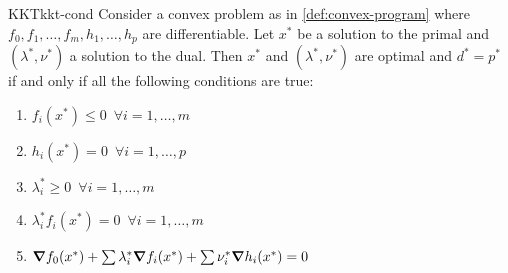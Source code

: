 \documentclass[12pt]{extarticle}
\begin{document}
\begin{theorem}{KKT}{kkt-cond}
	Consider a convex problem as in \cref{def:convex-program} where $f_0, f_1, \dots, f_m, h_1, \dots, h_p$
	are differentiable.
	Let $x^*$ be a solution to the primal and $(\lambda^*, \nu^*)$ a solution to the dual.
	Then $x^*$ and $(\lambda^*, \nu^*)$ are optimal and $d^* = p^*$ if and only if all the following
	conditions are true:
	\begin{enumerate}[label=(\roman*.)]
		\item $f_i(x^*) \leq 0 \enspace \forall i = 1, \dots, m$
		\item $h_i(x^*) = 0 \enspace \forall i = 1, \dots, p$
		\item $\lambda_i^* \geq 0 \enspace \forall i = 1, \dots, m$
		\item $\lambda^*_i f_i(x^*) = 0 \enspace \forall i = 1, \dots, m$
		\item $\grad f_0(x^*) + \sum \lambda_i^* \grad f_i(x^*) + \sum \nu_i^* \grad h_i(x^*) = 0$
	\end{enumerate}
\end{theorem}
\end{document}

